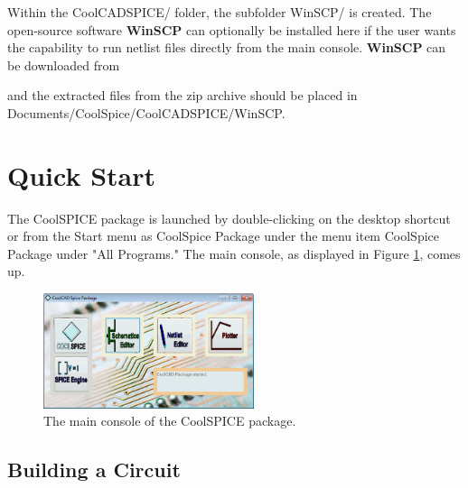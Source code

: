 Within the \textsf{CoolCADSPICE/} folder, the subfolder \textsf{WinSCP/} is created. The open-source software \textbf{WinSCP} can optionally be installed here if the user wants the capability to run netlist files directly from the main console.  {\bf WinSCP} can be downloaded from
\vspace{-\parskip}
\begin{center}
\vspace{-\parskip}
\end{center}
and the extracted files from the zip archive should be placed in \\ \textsf{Documents/CoolSpice/CoolCADSPICE/WinSCP}.  

\section{Quick Start}

\label{sec_iags_quickstart} 

The CoolSPICE package is launched by double-clicking on the desktop shortcut or from the Start menu as \textsf{CoolSpice Package}  under the menu item \textsf{CoolSpice Package} under "All Programs."  The main console, as displayed in Figure \ref{fig_mainconsole}, comes up.  

\begin{figure}
    \includegraphics[width=0.55\textwidth]{./figures/getting_started_figures/CoolSPICE_mainconsole.png}
	\caption{{The main console of the CoolSPICE package.}}
  \label{fig_mainconsole}
\end{figure}


\subsection{Building a Circuit}

